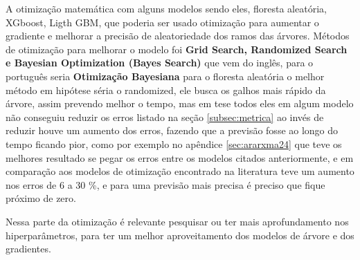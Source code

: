 A otimização matemática com alguns modelos sendo eles, floresta aleatória, XGboost, Ligth GBM, que poderia ser usado otimização para aumentar o gradiente e melhorar a precisão de aleatoriedade dos ramos das árvores. Métodos de otimização para melhorar o modelo foi \textbf{Grid Search, Randomized Search e Bayesian Optimization (Bayes Search)}  que vem do inglês, para o português seria \textbf{Otimização Bayesiana} para o floresta aleatória o melhor método em hipótese séria o randomized, ele busca os galhos mais rápido da árvore, assim prevendo melhor o tempo, mas em tese todos eles em algum modelo não conseguiu reduzir os erros listado na seção \ref{subsec:metrica} ao invés de reduzir houve um aumento dos erros, fazendo que a previsão fosse ao longo do tempo ficando pior, como por exemplo no apêndice \ref{sec:ararxma24} que teve os melhores resultado se pegar os erros entre os modelos citados anteriormente, e em comparação aos modelos de otimização encontrado na literatura teve um aumento nos erros de 6 a 30 \%, e para uma previsão mais precisa é preciso que fique próximo de zero.

Nessa parte da otimização é relevante pesquisar ou ter mais aprofundamento nos hiperparâmetros, para ter um melhor aproveitamento dos modelos de árvore e dos gradientes. 